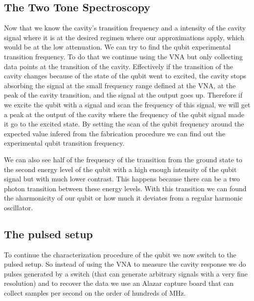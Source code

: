 \documentclass[11pt,onecolumm,a4paper]{article}
\begin{document}
\subsection{The Two Tone Spectroscopy}
Now that we know the cavity's transition frequency and a intensity of the cavity signal where it is at the desired regimen where our approximations apply, which would be at the low attenuation. We can try to find the qubit experimental transition frequency. To do that we continue using the VNA but only collecting data points at the transition of the cavity. Effectively if the transition of the cavity changes because of the state of the qubit went to excited, the cavity stops absorbing the signal at the small frequency range defined at the VNA, at the peak of the cavity transition, and the signal at the output goes up. Therefore if we excite the qubit with a signal and scan the frequency of this signal, we will get a peak at the output of the cavity where the frequency of the qubit signal made it go to the excited state. By setting the scan of the qubit frequency around the expected value infered from the fabrication procedure we can find out the experimental qubit transition frequency.

We can also see half of the frequency of the transition from the ground state to the second energy level of the qubit with a high enough intensity of the qubit signal but with much lower contrast. This happens because there can be a two photon transition between these energy levels. With this transition we can found the aharmonicity of our qubit or how much it deviates from a regular harmonic oscillator.

\subsection{The pulsed setup}
To continue the characterization procedure of the qubit we now switch to the pulsed setup. So instead of using the VNA to measure the cavity response we do pulses generated by a switch (that can generate arbitrary signals with a very fine resolution) and to recover the data we use an Alazar capture board that can collect samples per second on the order of hundreds of MHz. 
\end{document}
